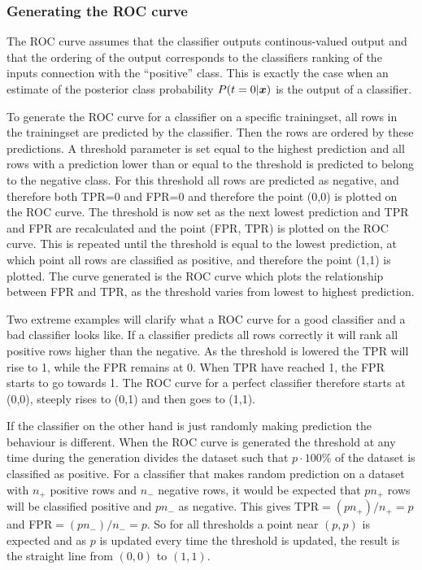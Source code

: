 \subsubsection{Generating the ROC curve}
The ROC curve assumes that the classifier outputs continous-valued output and that the ordering of the output corresponds to the classifiers ranking of the inputs connection with the ``positive'' class. This is exactly the case when an estimate of the posterior class probability $P(t=0|\boldsymbol{x})$ is the output of a classifier. \par
To generate the ROC curve for a classifier on a specific trainingset, all rows in the trainingset are predicted by the classifier. Then the rows are ordered by these predictions. A threshold parameter is set equal to the highest prediction and all rows with a prediction lower than or equal to the threshold is predicted to belong to the negative class. For this threshold all rows are predicted as negative, and therefore both TPR=0 and FPR=0 and therefore the point (0,0) is plotted on the ROC curve. The threshold is now set as the next lowest prediction and TPR and FPR are recalculated and the point (FPR, TPR) is plotted on the ROC curve. This is repeated until the threshold is equal to the lowest prediction, at which point all rows are classified as positive, and therefore the point (1,1) is plotted. The curve generated is the ROC curve which plots the relationship between FPR and TPR, as the threshold varies from lowest to highest prediction. \par
Two extreme examples will clarify what a ROC curve for a good classifier and a bad classifier looks like. If a classifier predicts all rows correctly it will rank all positive rows higher than the negative. As the threshold is lowered the TPR will rise to 1, while the FPR remains at 0. When TPR have reached 1, the FPR starts to go towards 1. The ROC curve for a perfect classifier therefore starts at (0,0), steeply rises to (0,1) and then goes to (1,1). \par
If the classifier on the other hand is just randomly making prediction the behaviour is different. When the ROC curve is generated the threshold at any time during the generation divides the dataset such that $p\cdot 100\%$ of the dataset is classified as positive. For a classifier that makes random prediction on a dataset with $n_+$ positive rows and $n_-$ negative rows, it would be expected that $pn_+$ rows will be classified positive and $pn_-$ as negative. This gives TPR$=(pn_+)/n_+=p$ and FPR$=(pn_-)/n_-=p$. So for all thresholds a point near $(p,p)$ is expected and as $p$ is updated every time the threshold is updated, the result is the straight line from $(0,0)$ to $(1,1)$. \par

